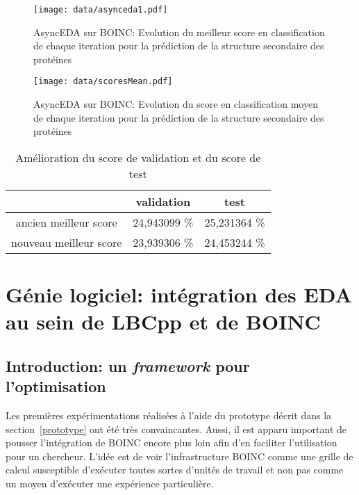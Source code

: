 \documentclass[a4paper, 11pt]{report}
\begin{document}
\begin{figure}[!h]
\centering
\texttt{[image: data/asynceda1.pdf]}	
\caption{AsyncEDA sur \textsc{BOINC}: Evolution du meilleur score en classification de chaque iteration pour la prédiction de la structure secondaire des protéines}
\label{asynceda1}
\end{figure}

\begin{figure}[!h]
\centering
\texttt{[image: data/scoresMean.pdf]}	
\caption{AsyncEDA sur \textsc{BOINC}: Evolution du score en classification moyen de chaque iteration pour la prédiction de la structure secondaire des protéines}
\label{scoresMean}
\end{figure}

\begin{table}[htdp]
\caption{Amélioration du score de validation et du score de test}
\begin{center}
\begin{tabular}{|c|c|c|}
\hline
 & validation & test\\
\hline
ancien meilleur score & 24,943099 \% & 25,231364 \%\\
nouveau meilleur score & 23,939306 \% & 24,453244 \%\\
\hline
\end{tabular}
\end{center}
\label{tabimprove}
\end{table}%


\chapter{Génie logiciel: intégration des EDA au sein de LBCpp et de \textsc{BOINC}}
\label{genie}


\section{Introduction: un \textit{framework} pour l'optimisation}
\label{frameworkintro1}
Les premières expérimentations réalisées à l'aide du prototype décrit dans la section~\ref{prototype} ont été très convaincantes. Aussi, il est apparu important de pousser l'intégration de \textsc{BOINC} encore plus loin afin d'en faciliter l'utilisation pour un chercheur. L'idée est de voir l'infrastructure \textsc{BOINC} comme une grille de calcul susceptible d'exécuter toutes sortes d'unités de travail et non pas comme un moyen d'exécuter une expérience particulière.
\end{document}
